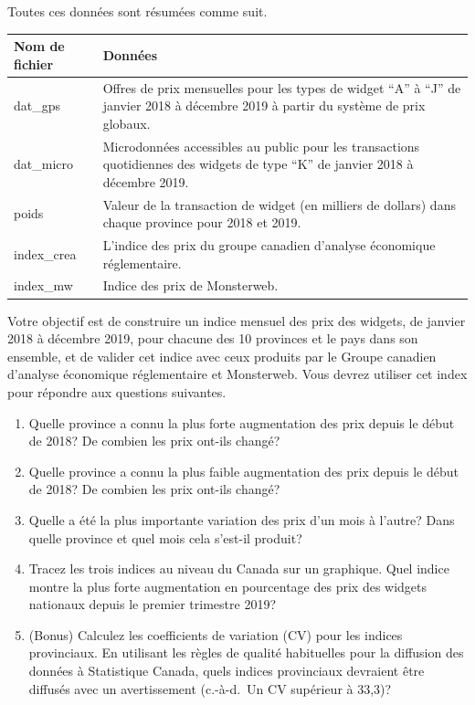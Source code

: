 \documentclass[
]{article}
\begin{document}
Toutes ces données sont résumées comme suit.

\begin{longtable}[]{@{}
  >{\raggedright\arraybackslash}p{}
  >{\raggedright\arraybackslash}p{}@{}}
\toprule
Nom de fichier & Données \\
\midrule
\endhead
dat\_gps & Offres de prix mensuelles pour les types de widget ``A'' à ``J'' de janvier 2018 à décembre 2019 à partir du système de prix globaux. \\
dat\_micro & Microdonnées accessibles au public pour les transactions quotidiennes des widgets de type ``K'' de janvier 2018 à décembre 2019. \\
poids & Valeur de la transaction de widget (en milliers de dollars) dans chaque province pour 2018 et 2019. \\
index\_crea & L'indice des prix du groupe canadien d'analyse économique réglementaire. \\
index\_mw & Indice des prix de Monsterweb. \\
\bottomrule
\end{longtable}

Votre objectif est de construire un indice mensuel des prix des widgets, de janvier 2018 à décembre 2019, pour chacune des 10 provinces et le pays dans son ensemble, et de valider cet indice avec ceux produits par le Groupe canadien d'analyse économique réglementaire et Monsterweb. Vous devrez utiliser cet index pour répondre aux questions suivantes.

\begin{enumerate}
\def\labelenumi{\arabic{enumi}.}
\item
  Quelle province a connu la plus forte augmentation des prix depuis le début de 2018? De combien les prix ont-ils changé?
\item
  Quelle province a connu la plus faible augmentation des prix depuis le début de 2018? De combien les prix ont-ils changé?
\item
  Quelle a été la plus importante variation des prix d'un mois à l'autre? Dans quelle province et quel mois cela s'est-il produit?
\item
  Tracez les trois indices au niveau du Canada sur un graphique. Quel indice montre la plus forte augmentation en pourcentage des prix des widgets nationaux depuis le premier trimestre 2019?
\item
  (Bonus) Calculez les coefficients de variation (CV) pour les indices provinciaux. En utilisant les règles de qualité habituelles pour la diffusion des données à Statistique Canada, quels indices provinciaux devraient être diffusés avec un avertissement (c.-à-d.~Un CV supérieur à 33,3)?
\end{enumerate}
\end{document}
